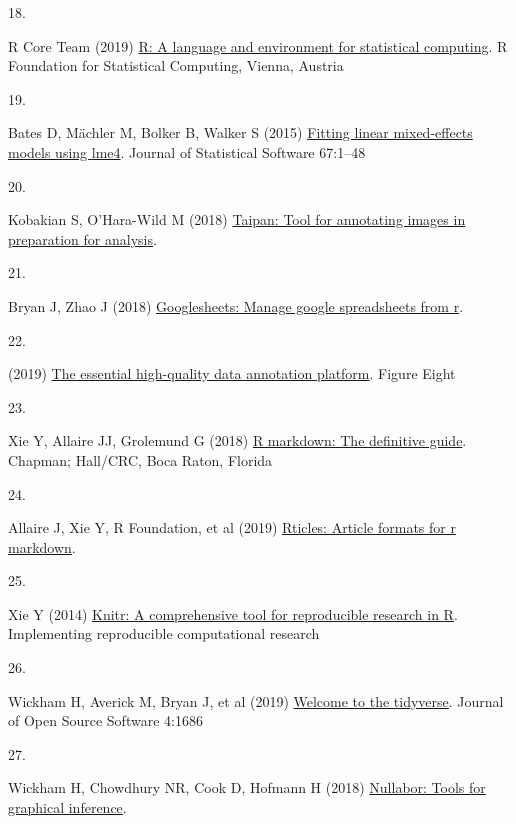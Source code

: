 \documentclass[conference,final,]{IEEEtran}
\newlength{\cslhangindent}
\newlength{\csllabelwidth}
\newlength{\cslentryspacingunit} %
\newenvironment{CSLReferences}[2] %
 {%
  \setlength{\parindent}{0pt}
  \ifodd #1
  \let\oldpar\par
  \def\par{\hangindent=\cslhangindent\oldpar}
  \fi
  \setlength{\parskip}{#2\cslentryspacingunit}
 }%
 {}
\newcommand{\CSLLeftMargin}[1]{\parbox[t]{\csllabelwidth}{#1}}
\newcommand{\CSLRightInline}[1]{\parbox[t]{\linewidth - \csllabelwidth}{#1}\break}
\begin{document}
\begin{CSLReferences}{0}{0}
\leavevmode{}%
\CSLLeftMargin{18. }%
\CSLRightInline{R Core Team (2019) \href{https://www.R-project.org/}{R: A language and environment for statistical computing}. R Foundation for Statistical Computing, Vienna, Austria}

\leavevmode{}%
\CSLLeftMargin{19. }%
\CSLRightInline{Bates D, Mächler M, Bolker B, Walker S (2015) \href{https://doi.org/10.18637/jss.v067.i01}{Fitting linear mixed-effects models using {lme4}}. Journal of Statistical Software 67:1--48}

\leavevmode{}%
\CSLLeftMargin{20. }%
\CSLRightInline{Kobakian S, O'Hara-Wild M (2018) \href{https://CRAN.R-project.org/package=taipan}{Taipan: Tool for annotating images in preparation for analysis}. }

\leavevmode{}%
\CSLLeftMargin{21. }%
\CSLRightInline{Bryan J, Zhao J (2018) \href{https://CRAN.R-project.org/package=googlesheets}{Googlesheets: Manage google spreadsheets from r}. }

\leavevmode{}%
\CSLLeftMargin{22. }%
\CSLRightInline{(2019) \href{https://www.figure-eight.com/}{The essential high-quality data annotation platform}. Figure Eight }

\leavevmode{}%
\CSLLeftMargin{23. }%
\CSLRightInline{Xie Y, Allaire JJ, Grolemund G (2018) \href{https://bookdown.org/yihui/rmarkdown}{R markdown: The definitive guide}. Chapman; Hall/CRC, Boca Raton, Florida}

\leavevmode{}%
\CSLLeftMargin{24. }%
\CSLRightInline{Allaire J, Xie Y, R Foundation, et al (2019) \href{https://CRAN.R-project.org/package=rticles}{Rticles: Article formats for r markdown}. }

\leavevmode{}%
\CSLLeftMargin{25. }%
\CSLRightInline{Xie Y (2014) \href{http://www.crcpress.com/product/isbn/9781466561595}{Knitr: A comprehensive tool for reproducible research in {R}}. Implementing reproducible computational research }

\leavevmode{}%
\CSLLeftMargin{26. }%
\CSLRightInline{Wickham H, Averick M, Bryan J, et al (2019) \href{https://doi.org/10.21105/joss.01686}{Welcome to the {tidyverse}}. Journal of Open Source Software 4:1686}

\leavevmode{}%
\CSLLeftMargin{27. }%
\CSLRightInline{Wickham H, Chowdhury NR, Cook D, Hofmann H (2018) \href{https://CRAN.R-project.org/package=nullabor}{Nullabor: Tools for graphical inference}. }


\end{CSLReferences}
\end{document}
